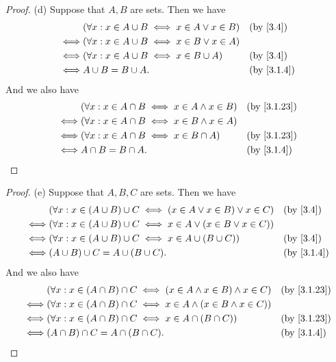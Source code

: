 \begin{proof}{(d)}
  Suppose that \(A, B\) are sets.
  Then we have
  \begin{align*}
         & (\forall x : x \in A \cup B \iff x \in A \lor x \in B) &  & \text{(by \cref{3.4})} \\
    \iff & (\forall x : x \in A \cup B \iff x \in B \lor x \in A)                             \\
    \iff & (\forall x : x \in A \cup B \iff x \in B \cup A)       &  & \text{(by \cref{3.4})} \\
    \iff & A \cup B = B \cup A.                                   &  & \by{3.1.4}
  \end{align*}
  And we also have
  \begin{align*}
         & (\forall x : x \in A \cap B \iff x \in A \land x \in B) &  & \by{3.1.23} \\
    \iff & (\forall x : x \in A \cap B \iff x \in B \land x \in A)                  \\
    \iff & (\forall x : x \in A \cap B \iff x \in B \cap A)        &  & \by{3.1.23} \\
    \iff & A \cap B = B \cap A.                                    &  & \by{3.1.4}
  \end{align*}
\end{proof}

\begin{proof}{(e)}
  Suppose that \(A, B, C\) are sets.
  Then we have
  \begin{align*}
         & (\forall x : x \in (A \cup B) \cup C \iff (x \in A \lor x \in B) \lor x \in C) &  & \text{(by \cref{3.4})} \\
    \iff & (\forall x : x \in (A \cup B) \cup C \iff x \in A \lor (x \in B \lor x \in C))                             \\
    \iff & (\forall x : x \in (A \cup B) \cup C \iff x \in A \cup (B \cup C))             &  & \text{(by \cref{3.4})} \\
    \iff & (A \cup B) \cup C = A \cup (B \cup C).                                         &  & \by{3.1.4}
  \end{align*}
  And we also have
  \begin{align*}
         & (\forall x : x \in (A \cap B) \cap C \iff (x \in A \land x \in B) \land x \in C) &  & \by{3.1.23} \\
    \iff & (\forall x : x \in (A \cap B) \cap C \iff x \in A \land (x \in B \land x \in C))                  \\
    \iff & (\forall x : x \in (A \cap B) \cap C \iff x \in A \cap (B \cap C))               &  & \by{3.1.23} \\
    \iff & (A \cap B) \cap C = A \cap (B \cap C).                                           &  & \by{3.1.4}
  \end{align*}
\end{proof}

